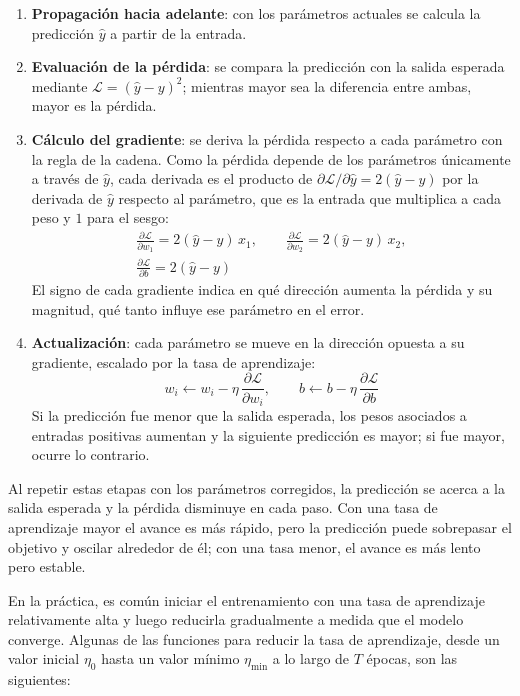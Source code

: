 \begin{enumerate}
	\item \textbf{Propagación hacia adelante}: con los parámetros actuales se calcula la predicción $\hat{y}$ a partir de la entrada.
	\item \textbf{Evaluación de la pérdida}: se compara la predicción con la salida esperada mediante $\mathcal{L} = (\hat{y} - y)^2$; mientras mayor sea la diferencia entre ambas, mayor es la pérdida.
	\item \textbf{Cálculo del gradiente}: se deriva la pérdida respecto a cada parámetro con la regla de la cadena. Como la pérdida depende de los parámetros únicamente a través de $\hat{y}$, cada derivada es el producto de $\partial \mathcal{L} / \partial \hat{y} = 2(\hat{y} - y)$ por la derivada de $\hat{y}$ respecto al parámetro, que es la entrada que multiplica a cada peso y $1$ para el sesgo:
	\begin{gather*}
		\frac{\partial \mathcal{L}}{\partial w_1} = 2(\hat{y} - y)\, x_1, \qquad
		\frac{\partial \mathcal{L}}{\partial w_2} = 2(\hat{y} - y)\, x_2, \\
		\frac{\partial \mathcal{L}}{\partial b} = 2(\hat{y} - y)
	\end{gather*}
	El signo de cada gradiente indica en qué dirección aumenta la pérdida y su magnitud, qué tanto influye ese parámetro en el error.
	\item \textbf{Actualización}: cada parámetro se mueve en la dirección opuesta a su gradiente, escalado por la tasa de aprendizaje:
	\[
		w_i \leftarrow w_i - \eta\, \frac{\partial \mathcal{L}}{\partial w_i}, \qquad
		b \leftarrow b - \eta\, \frac{\partial \mathcal{L}}{\partial b}
	\]
	Si la predicción fue menor que la salida esperada, los pesos asociados a entradas positivas aumentan y la siguiente predicción es mayor; si fue mayor, ocurre lo contrario.
\end{enumerate}

Al repetir estas etapas con los parámetros corregidos, la predicción se acerca a la salida esperada y la pérdida disminuye en cada paso. Con una tasa de aprendizaje mayor el avance es más rápido, pero la predicción puede sobrepasar el objetivo y oscilar alrededor de él; con una tasa menor, el avance es más lento pero estable.

En la práctica, es común iniciar el entrenamiento con una tasa de aprendizaje relativamente alta y luego reducirla gradualmente a medida que el modelo converge. Algunas de las funciones para reducir la tasa de aprendizaje, desde un valor inicial $\eta_0$ hasta un valor mínimo $\eta_{\min}$ a lo largo de $T$ épocas, son las siguientes:

